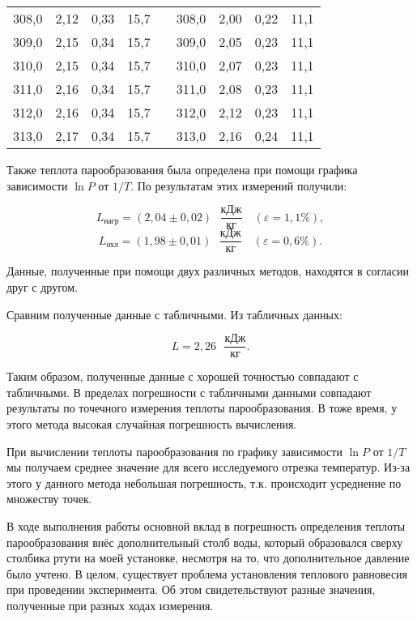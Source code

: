 \documentclass[a4paper,12pt]{article} %
\begin{document}
\begin{table}[H]
\begin{tabular}{|c|c|c|c|c|c|c|c|c|}
		308,0 & 2,12 & 0,33 & 15,7 &  & 308,0 & 2,00 & 0,22 & 11,1 \\ \cline{1-4} \cline{6-9} 
		309,0 & 2,15 & 0,34 & 15,7 &  & 309,0 & 2,05 & 0,23 & 11,1 \\ \cline{1-4} \cline{6-9} 
		310,0 & 2,15 & 0,34 & 15,7 &  & 310,0 & 2,07 & 0,23 & 11,1 \\ \cline{1-4} \cline{6-9} 
		311,0 & 2,16 & 0,34 & 15,7 &  & 311,0 & 2,08 & 0,23 & 11,1 \\ \cline{1-4} \cline{6-9} 
		312,0 & 2,16 & 0,34 & 15,7 &  & 312,0 & 2,12 & 0,23 & 11,1 \\ \cline{1-4} \cline{6-9} 
		313,0 & 2,17 & 0,34 & 15,7 &  & 313,0 & 2,16 & 0,24 & 11,1 \\ \cline{1-4} \cline{6-9} 
	\end{tabular}
	
\end{table}

Также теплота парообразования была определена при помощи графика зависимости $ \ln P $ от $ 1/T $. По результатам этих измерений получили:

\[ \boxed{L_\text{нагр} = \left(2,04 \pm 0,02\right) \text{ } \frac{\text{кДж}}{\text{кг}} \quad (\varepsilon = 1,1 \%),} \]
\[ \boxed{L_\text{охл} = \left(1,98 \pm 0,01\right) \text{ } \frac{\text{кДж}}{\text{кг}} \quad (\varepsilon = 0,6 \%).}  \]

Данные, полученные при помощи двух различных методов, находятся в согласии друг с другом.

Сравним полученные данные с табличными. Из табличных данных:

\[ L = 2,26 \text{ } \frac{\text{кДж}}{\text{кг}}. \]

Таким образом, полученные данные с хорошей точностью совпадают с табличными. В пределах погрешности с табличными данными совпадают результаты по точечного измерения теплоты парообразования. В тоже время, у этого метода высокая случайная погрешность вычисления.

При вычислении теплоты парообразования по графику зависимости $ \ln P $ от $ 1/T $ мы получаем среднее значение для всего исследуемого отрезка температур. Из-за этого у данного метода небольшая погрешность, т.к. происходит усреднение по множеству точек.

В ходе выполнения работы основной вклад в погрешность определения теплоты парообразования внёс дополнительный столб воды, который образовался сверху столбика ртути на моей установке, несмотря на то, что дополнительное давление было учтено. В целом, существует проблема установления теплового равновесия при проведении эксперимента. Об этом свидетельствуют разные значения, полученные при разных ходах измерения.
\end{document}
